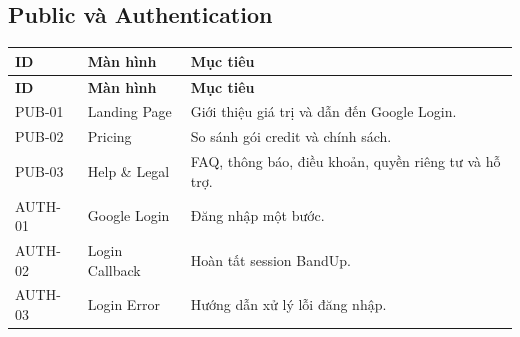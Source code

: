 \documentclass[11pt,a4paper]{article}
\begin{document}
\subsection{Public và Authentication}
\small
\begin{longtable}{|P{0.14\textwidth}|P{0.31\textwidth}|P{0.45\textwidth}|}
\hline
\textbf{ID} & \textbf{Màn hình} & \textbf{Mục tiêu} \\ \hline
\endfirsthead
\hline
\textbf{ID} & \textbf{Màn hình} & \textbf{Mục tiêu} \\ \hline
\endhead
PUB-01 & Landing Page & Giới thiệu giá trị và dẫn đến Google Login. \\ \hline
PUB-02 & Pricing & So sánh gói credit và chính sách. \\ \hline
PUB-03 & Help \& Legal & FAQ, thông báo, điều khoản, quyền riêng tư và hỗ trợ. \\ \hline
AUTH-01 & Google Login & Đăng nhập một bước. \\ \hline
AUTH-02 & Login Callback & Hoàn tất session BandUp. \\ \hline
AUTH-03 & Login Error & Hướng dẫn xử lý lỗi đăng nhập. \\ \hline
\end{longtable}
\end{document}

